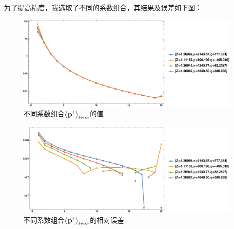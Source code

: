 \documentclass[hyperref,cs4size,titlepage,twoside]{ctexart}
\begin{document}
为了提高精度，我选取了不同的系数组合，其结果及误差如下图：
\begin{figure}[!htbp]
  \centering
  \includegraphics[width=6in]{Test_p4True_2.eps}
  \caption{不同系数组合$\expval{\vb{p}^4}_{true}$的值}\label{p4true pic}
\end{figure}
\begin{figure}[!htbp]
  \centering
  \includegraphics[width=6in]{Test_p4True_2_1.eps}
  \caption{不同系数组合$\expval{\vb{p}^4}_{true}$的相对误差}\label{relative error p4true}
\end{figure}
\end{document}
